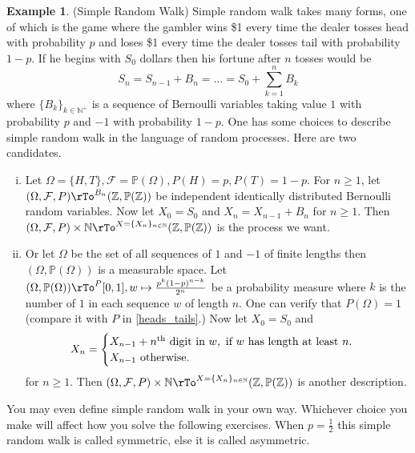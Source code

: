 \documentclass[12pt]{amsart}
\theoremstyle{definition}
\newtheorem{example}[theorem]{Example}
\begin{document}
\begin{example} \label{simple_random_walk} (Simple Random Walk) Simple random walk takes many forms, one of which is the game where the gambler wins \$1 every time the dealer tosses head with probability $p$ and loses \$1 every time the dealer tosses tail with probability $1 - p$. If he begins with $S_0$ dollars then his fortune after $n$ tosses would be
$$S_n = S_{n-1} + B_n = \dots = S_0 + \sum\limits_{k=1}^n B_k$$
where $\{B_{k}\}_{k \in \mathbb{N}^+}$ is a sequence of Bernoulli variables taking value $1$ with probability $p$ and $-1$ with probability $1 - p$. One has some choices to describe simple random walk in the language of random processes. Here are two candidates.
\begin{enumerate}[i.]
\item Let $\Omega = \{H, T\}, \mathcal{F} = \mathbb{P}(\Omega), P(H) = p, P(T) = 1 - p$. For $n \geq 1$, let $(\Omega, \mathcal{F}, P) \rTo^{B_n} (\mathbb{Z}, \mathbb{P}(\mathbb{Z}))$ be independent identically distributed Bernoulli random variables. Now let $X_0 = S_0$ and $X_n = X_{n-1} + B_n$ for $n \geq 1$. Then $(\Omega, \mathcal{F}, P) \times \mathbb{N} \rTo^{X = \{X_n\}_{n \in \mathbb{N}}} (\mathbb{Z}, \mathbb{P}(\mathbb{Z}))$ is the process we want.
\item Or let $\Omega$ be the set of all sequences of $1$ and $-1$ of finite lengths then $(\Omega, \mathbb{P}(\Omega))$ is a measurable space. Let $(\Omega, \mathbb{P}(\Omega)) \rTo^{P} \text{} [0, 1], w \mapsto \frac{p^{k}(1 - p)^{n-k}}{2^n}$ be a probability measure where $k$ is the number of $1$ in each sequence $w$ of length $n$. One can verify that $P(\Omega) = 1$ (compare it with $P$ in \ref{heads_tails}.) Now let $X_0 = S_0$ and
$$X_n =  \begin{cases}
X_{n-1} + n^{\textnormal{th}} \text{ digit in } w, \text{ if } w \text{ has length at least } n.\\
X_{n-1} \text{ otherwise}. \end{cases}$$
 for $n \geq 1$. Then $(\Omega, \mathcal{F}, P) \times \mathbb{N} \rTo^{X = \{X_n\}_{n \in \mathbb{N}}} (\mathbb{Z}, \mathbb{P}(\mathbb{Z}))$ is another description.
\end{enumerate}

You may even define simple random walk in your own way. Whichever choice you make will affect how you solve the following exercises. When $p = \frac{1}{2}$ this simple random walk is called symmetric, else it is called asymmetric.
\end{example}
\end{document}
